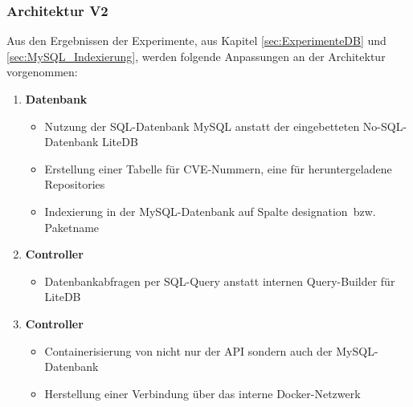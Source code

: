 \subsubsection{Architektur V2} \label{sec:ArchitekturV2}
    Aus den Ergebnissen der Experimente, aus Kapitel \ref{sec:ExperimenteDB} und \ref{sec:MySQL_Indexierung}, werden folgende Anpassungen an der Architektur vorgenommen:
    \begin{enumerate}
        \item \textbf{Datenbank}
            \begin{itemize}
                \item Nutzung der SQL-Datenbank MySQL anstatt der eingebetteten No-SQL-Datenbank LiteDB
                \item Erstellung einer Tabelle für \ac{CVE}-Nummern, eine für heruntergeladene Repositories
                \item Indexierung in der MySQL-Datenbank auf Spalte \glqq designation\grqq~bzw. Paketname
            \end{itemize}
        \item \textbf{Controller}
            \begin{itemize}
                \item Datenbankabfragen per SQL-Query anstatt internen Query-Builder für LiteDB
            \end{itemize}
        \item \textbf{Controller}
            \begin{itemize}
                \item Containerisierung von nicht nur der \ac{API} sondern auch der MySQL-Datenbank
                \item Herstellung einer Verbindung über das interne Docker-Netzwerk
            \end{itemize}
    \end{enumerate}
